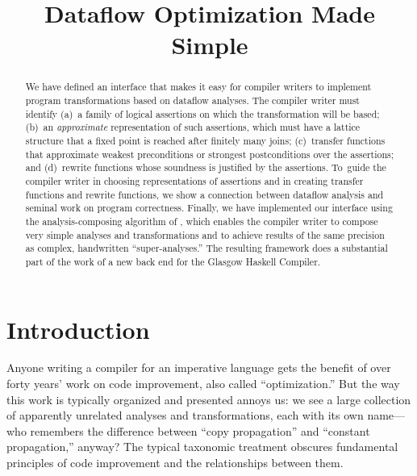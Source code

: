 \documentclass[blockstyle,preprint,nocopyrightspace]{sigplanconf}
\begin{document}
\title{Dataflow Optimization Made Simple}



\maketitle
 
\begin{abstract}
We have defined an interface that makes it easy for compiler writers
to implement program transformations based on dataflow analyses.
The compiler writer must identify (a)~a family of logical assertions
on which the transformation will be based;
(b)~an \emph{approximate} representation of such assertions, which
must have a lattice structure that a fixed point is reached after
finitely many joins;
(c)~transfer functions that approximate weakest preconditions or
strongest postconditions over the assertions; and
(d)~rewrite functions whose soundness is justified by the assertions.
To~guide the compiler writer in choosing representations of assertions
and in creating transfer functions and rewrite functions, we show a
connection between dataflow analysis and seminal work on program
correctness. 
Finally, we have implemented our interface using the
analysis-composing algorithm of 
\citet{lerner-grove-chambers:2002}, which enables the compiler writer to
compose very simple analyses and transformations and to achieve
results of the same precision as complex, handwritten
``super-analyses.''
The resulting framework does a substantial part of the work of a new
back end for the Glasgow Haskell Compiler.
\end{abstract}

\makeatactive   %

\section{Introduction}

Anyone writing a compiler for an imperative language gets the benefit
of over forty years' work on code improvement, also called
``optimization.''
But the way this work is typically organized and presented annoys us: 
we see a large collection of apparently unrelated analyses and
transformations, each with its own name---who remembers the difference
between ``copy propagation'' and ``constant propagation,'' anyway?
The typical taxonomic treatment obscures fundamental principles of
code improvement and the relationships between them.
\end{document}
